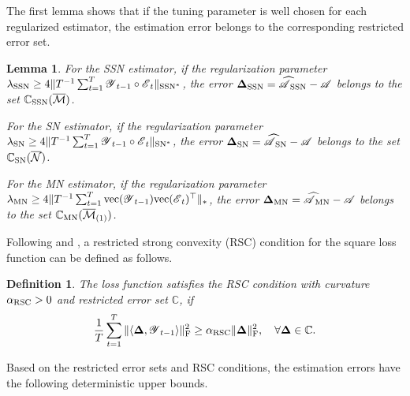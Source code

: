 \documentclass[12pt]{article}
\newtheorem{definition}{Definition}
\newtheorem{lemma}{Lemma}
\newcommand{\bm}{\boldsymbol}
\newcommand{\cm}[1]{\mbox{\boldmath$\mathscr{#1}$}}
\begin{document}
The first lemma shows that if the tuning parameter is well chosen for each regularized estimator, the estimation error belongs to the corresponding restricted error set.

\begin{lemma} \label{lemma:ApproxCone}
	For the SSN estimator, if the regularization parameter $\lambda_{\textup{SSN}}\geq4\|T^{-1}\sum_{t=1}^T\cm{Y}_{t-1}\circ\cm{E}_t\|_{\textup{SSN}^*}$, the error $\bm{\Delta}_{\textup{SSN}}=\cm{\widehat{A}}_{\textup{SSN}}-\cm{A}$ belongs to the set $\mathbb{C}_{\textup{SSN}}(\overline{\mathcal{M}})$. 
	
	For the SN estimator, if the regularization parameter $\lambda_{\textup{SN}}\geq4\|T^{-1}\sum_{t=1}^T\cm{Y}_{t-1}\circ\cm{E}_t\|_{\textup{SN}^*}$, the error $\bm{\Delta}_{\textup{SN}}=\cm{\widehat{A}}_{\textup{SN}}-\cm{A}$ belongs to the set $\mathbb{C}_{\textup{SN}}(\overline{\mathcal{N}})$.
	
	For the MN estimator, if the regularization parameter $\lambda_{\textup{MN}}\geq4\|T^{-1}\sum_{t=1}^T\textup{vec}(\cm{Y}_{t-1})\textup{vec}(\cm{E}_t)^\top\|_{*}$, the error $\bm{\Delta}_{\textup{MN}}=\cm{\widehat{A}}_{\textup{MN}}-\cm{A}$ belongs to the set $\mathbb{C}_{\textup{MN}}(\overline{\mathcal{M}}_{(1)})$.
\end{lemma}

Following \citet{negahban2012restricted} and \citet{negahban2012unified}, a restricted strong convexity (RSC) condition for the square loss function can be defined as follows.

\begin{definition} \label{dfn:rsc}
	The loss function satisfies the RSC condition with curvature $\alpha_{\textup{RSC}}>0$ and restricted error set $\mathbb{C}$, if
	\begin{equation}
	\frac{1}{T}\sum_{t=1}^T	\|\langle\bm{\Delta},\cm{Y}_{t-1}\rangle\|_\text{F}^2\geq\alpha_{\textup{RSC}}\|\bm{\Delta}\|_{\textup{F}}^2,~~~\forall\bm{\Delta}\in\mathbb{C}.
	\end{equation}
\end{definition}



Based on the restricted error sets and RSC conditions, the estimation errors have the following deterministic upper bounds.
\end{document}
